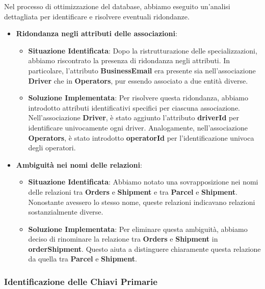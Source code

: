 Nel processo di ottimizzazione del database, abbiamo eseguito un'analisi dettagliata per identificare e risolvere eventuali ridondanze.

\begin{itemize}[leftmargin=*,label={\textbullet},itemsep=0pt,topsep=0pt,partopsep=0pt]
  \item \textbf{Ridondanza negli attributi delle associazioni}:
        \begin{itemize}[leftmargin=*,label={\textbullet},itemsep=0pt,topsep=0pt,partopsep=0pt]
          \item \textbf{Situazione Identificata}: Dopo la ristrutturazione delle specializzazioni, abbiamo riscontrato la presenza di ridondanza negli attributi. In particolare, l'attributo \textbf{BusinessEmail} era presente sia nell'associazione \textbf{Driver} che in \textbf{Operators}, pur essendo associato a due entità diverse.
          \item \textbf{Soluzione Implementata}: Per risolvere questa ridondanza, abbiamo introdotto attributi identificativi specifici per ciascuna associazione. Nell'associazione \textbf{Driver}, è stato aggiunto l'attributo \textbf{driverId} per identificare univocamente ogni driver. Analogamente, nell'associazione \textbf{Operators}, è stato introdotto \textbf{operatorId} per l'identificazione univoca degli operatori.
        \end{itemize}
  \item \textbf{Ambiguità nei nomi delle relazioni}:
        \begin{itemize}[leftmargin=*,label={\textbullet},itemsep=0pt,topsep=0pt,partopsep=0pt]
          \item \textbf{Situazione Identificata}: Abbiamo notato una sovrapposizione nei nomi delle relazioni tra \textbf{Orders} e \textbf{Shipment} e tra \textbf{Parcel} e \textbf{Shipment}. Nonostante avessero lo stesso nome, queste relazioni indicavano relazioni sostanzialmente diverse.
          \item \textbf{Soluzione Implementata}: Per eliminare questa ambiguità, abbiamo deciso di rinominare la relazione tra \textbf{Orders} e \textbf{Shipment} in \textbf{orderShipment}. Questo aiuta a distinguere chiaramente questa relazione da quella tra \textbf{Parcel} e \textbf{Shipment}.
        \end{itemize}
\end{itemize}

\subsubsection{Identificazione delle Chiavi Primarie}

